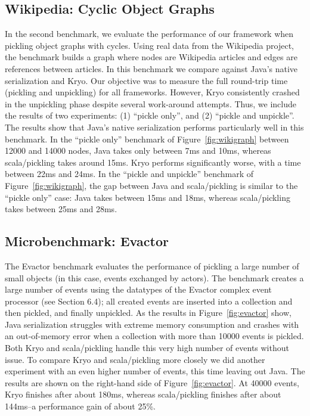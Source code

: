 \documentclass[10pt]{sigplanconf}
\theoremstyle{definition}
\theoremstyle{definition}
\begin{document}
\subsection{Wikipedia: Cyclic Object Graphs}

In the second benchmark, we evaluate the performance of our framework when
pickling object graphs with cycles. Using real data from the Wikipedia
project, the benchmark builds a graph where nodes are Wikipedia articles and
edges are references between articles. In this benchmark we compare against
Java's native serialization and Kryo. Our objective was to measure the full
round-trip time (pickling and unpickling) for all frameworks. However, Kryo
consistently crashed in the unpickling phase despite several work-around
attempts. Thus, we include the results of two experiments: (1) ``pickle
only'', and (2) ``pickle and unpickle''. The results show that Java's native
serialization performs particularly well in this benchmark. In the ``pickle
only'' benchmark of Figure~\ref{fig:wikigraph} between 12000 and 14000 nodes, Java takes only between 7ms and
10ms, whereas scala/pickling takes around 15ms. Kryo performs significantly
worse, with a time between 22ms and 24ms. In the ``pickle and unpickle''
benchmark of Figure~\ref{fig:wikigraph}, the gap between Java and scala/pickling is similar to the ``pickle
only'' case: Java takes between 15ms and 18ms, whereas scala/pickling takes
between 25ms and 28ms.

\subsection{Microbenchmark: Evactor}

The Evactor benchmark evaluates the performance of pickling a large number of
small objects (in this case, events exchanged by actors). The benchmark
creates a large number of events using the datatypes of the Evactor complex
event processor  (see Section 6.4); all created events are inserted into a
collection and then pickled, and finally unpickled. As the results in
Figure~\ref{fig:evactor} show, Java serialization struggles with extreme memory
consumption and crashes with an out-of-memory error when a collection with
more than 10000 events is pickled. Both Kryo and scala/pickling handle this
very high number of events without issue. To compare Kryo and scala/pickling
more closely we did another experiment with an even higher number of events,
this time leaving out Java. The results are shown on the right-hand side of
Figure~\ref{fig:evactor}. At 40000 events, Kryo finishes after about 180ms, whereas
scala/pickling finishes after about 144ms--a performance gain of about 25\%.
\end{document}
